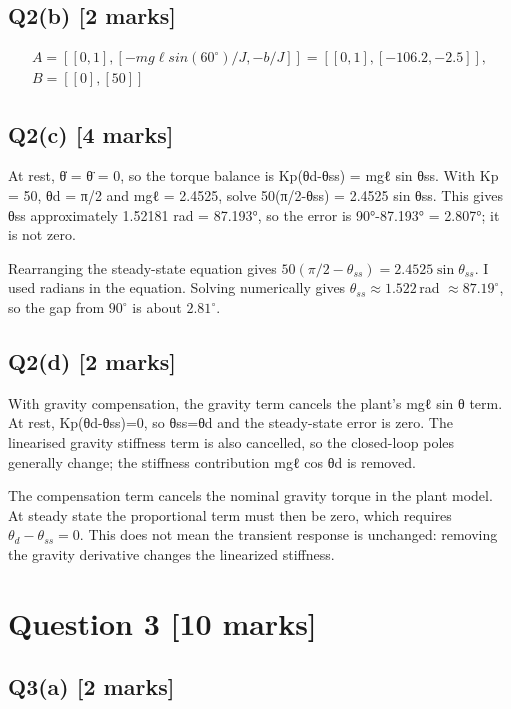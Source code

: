 \documentclass[11pt,a4paper]{article}
\begin{document}
\subsection*{Q2(b) \hfill [2 marks]}

\[\begin{aligned}A = [[0,1], [-mg\ell sin(60^{\circ})/J, -b/J]] = [[0,1], [-106.2, -2.5]],\\ B = [[0],[50]]\end{aligned}\]

\subsection*{Q2(c) \hfill [4 marks]}

At rest, θ̇ = θ̈ = 0, so the torque balance is Kp(θd-θss) = mgℓ sin θss.
With Kp = 50, θd = π/2 and mgℓ = 2.4525, solve 50(π/2-θss) = 2.4525 sin θss.
This gives θss approximately 1.52181 rad = 87.193°, so the error is 90°-87.193° = 2.807°; it is not zero.\par\smallskip Rearranging the steady-state equation gives $50(\pi/2-\theta_{ss})=2.4525\sin\theta_{ss}$. I used radians in the equation. Solving numerically gives $\theta_{ss}\approx1.522\,$rad $\approx87.19^\circ$, so the gap from $90^\circ$ is about $2.81^\circ$.

\subsection*{Q2(d) \hfill [2 marks]}

With gravity compensation, the gravity term cancels the plant's mgℓ sin θ term.
At rest, Kp(θd-θss)=0, so θss=θd and the steady-state error is zero.
The linearised gravity stiffness term is also cancelled, so the closed-loop poles generally change; the stiffness contribution mgℓ cos θd is removed.\par\smallskip The compensation term cancels the nominal gravity torque in the plant model. At steady state the proportional term must then be zero, which requires $\theta_d-\theta_{ss}=0$. This does not mean the transient response is unchanged: removing the gravity derivative changes the linearized stiffness.

\section*{Question 3 \hfill [10 marks]}
\subsection*{Q3(a) \hfill [2 marks]}
\end{document}
